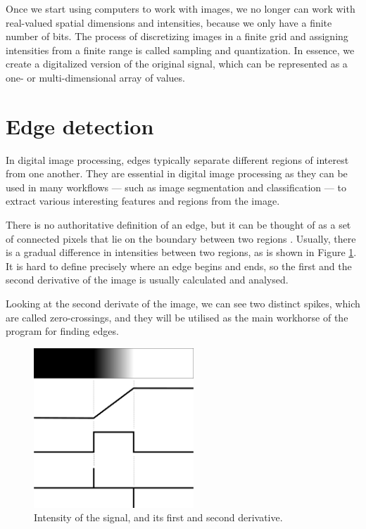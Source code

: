 \documentclass[
  digital,     %
  oneside,     %
  nosansbold,  %
  nocolorbold, %
  lof,         %
  lot,         %
]{fithesis4}
\begin{document}
Once we start using computers to work with images, we no longer can work with
real-valued spatial dimensions and intensities, because we only have a finite
number of bits. The process of discretizing images in a finite grid and assigning
intensities from a finite range is called sampling and quantization. In essence,
we create a digitalized version of the original signal, which can be represented
as a one- or \mbox{multi-dimensional} array of values.

\section{Edge detection}

In digital image processing, edges typically separate different regions of
interest from one another. They are essential in digital image processing
as they can be used in many workflows --- such as image segmentation and
classification --- to extract various interesting features and regions
from the image.

There is no authoritative definition of an edge, but it can be thought of as a
set of connected pixels that lie on the boundary between two regions
\cite{gonzalez2002}. Usually, there is a gradual difference in intensities
between two regions, as is shown in Figure \ref{fig:edge_intensities}. It is
hard to define precisely where an edge begins and ends, so the first and the
second derivative of the image is usually calculated and analysed.

Looking at the second derivate of the image, we can see two distinct spikes,
which are called zero-crossings, and they will be utilised as the main workhorse
of the program for finding edges.

\begin{figure}
    \begin{center}
        \includegraphics[width=6cm]{resources/inkscape/gradient.png}
    \end{center}
    \caption{Intensity of the signal, and its first and second derivative.}
    \label{fig:edge_intensities}
\end{figure}
\end{document}
